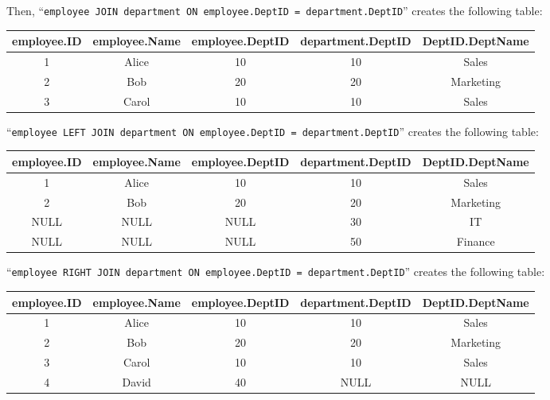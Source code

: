\documentclass{article}
\begin{document}
\begin{itemize}
		Then, ``\texttt{employee JOIN department ON employee.DeptID = department.DeptID}'' creates the following table:\\
		\begin{center}
			\begin{tabular}{|c|c|c|c|c|}
				employee.ID & employee.Name  & employee.DeptID & department.DeptID & DeptID.DeptName \\
				\hline
				1  & Alice & 10 & 10 & Sales\\
				2  & Bob   & 20 & 20 & Marketing\\
				3  & Carol & 10 & 10 & Sales
			\end{tabular}
		\end{center}
		\vspace*{4mm}
		
		``\texttt{employee LEFT JOIN department ON employee.DeptID = department.DeptID}'' creates the following table:\\
		\begin{center}
			\begin{tabular}{|c|c|c|c|c|}
				employee.ID & employee.Name  & employee.DeptID & department.DeptID & DeptID.DeptName \\
				\hline
				1  & Alice & 10 & 10 & Sales\\
				2  & Bob   & 20 & 20 & Marketing\\
				NULL  & NULL & NULL & 30 & IT\\
				NULL  & NULL & NULL & 50 & Finance
			\end{tabular}
		\end{center}
		
		\vspace*{4mm}
		
		``\texttt{employee RIGHT JOIN department ON employee.DeptID = department.DeptID}'' creates the following table:\\
		\begin{center}
			\begin{tabular}{|c|c|c|c|c|}
				employee.ID & employee.Name  & employee.DeptID & department.DeptID & DeptID.DeptName \\
				\hline
				1  & Alice & 10 & 10 & Sales\\
				2  & Bob   & 20 & 20 & Marketing\\
				3  & Carol & 10 & 10 & Sales\\
				4  & David & 40 & NULL & NULL
			\end{tabular}
		\end{center}
		\vspace*{4mm}
		

\end{itemize}
\end{document}
